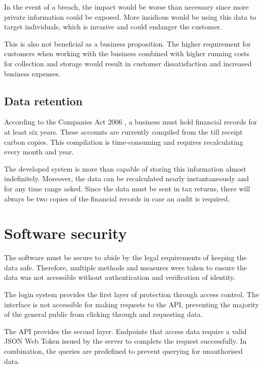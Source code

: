 In the event of a breach, the impact would be worse than necessary since more private information could be exposed. More insidious would be using this data to target individuals, which is invasive and could endanger the customer.

This is also not beneficial as a business proposition. The higher requirement for customers when working with the business combined with higher running costs for collection and storage would result in customer dissatisfaction and increased business expenses.


\subsection{Data retention}
According to the Companies Act 2006 \parencite{participation_companies_nodate}, a business must hold financial records for at least six years. These accounts are currently compiled from the till receipt carbon copies. This compilation is time-consuming and requires recalculating every month and year.

The developed system is more than capable of storing this information almost indefinitely. Moreover, the data can be recalculated nearly instantaneously and for any time range asked. Since the data must be sent in tax returns, there will always be two copies of the financial records in case an audit is required.



\section{Software security}
The software must be secure to abide by the legal requirements of keeping the data safe. Therefore, multiple methods and measures were taken to ensure the data was not accessible without authentication and verification of identity.

The login system provides the first layer of protection through access control. The interface is not accessible for making requests to the API, preventing the majority of the general public from clicking through and requesting data. 

The API provides the second layer. Endpoints that access data require a valid JSON Web Token issued by the server to complete the request successfully. In combination, the queries are predefined to prevent querying for unauthorised data.

